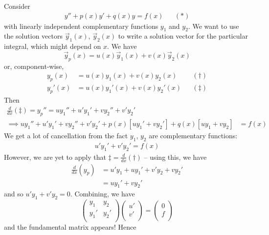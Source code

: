 \documentclass{../../template/note}
\begin{document}
    Consider
    \begin{align*}
        y'' + p(x)y' + q(x)y = f(x) && (*)
    \end{align*}
    with linearly independent complementary functions \(y_1\) and \(y_2\). We want to use the solution vectors \(\vec y_1(x)\), \(\vec y_2(x)\) to write a solution vector for the particular integral, which might depend on \(x\). We have
    \[
        \vec y_p(x) = u(x) \vec y_1(x) + v(x) \vec y_2(x)
    \]
    or, component-wise,
    \begin{align*}
        y_p(x) &= u(x)y_1(x) + v(x)y_2(x) && (\dagger) \\
        y_p'(x) &= u(x)y_1'(x) + v(x)y_2'(x) && (\ddagger)
    \end{align*}
    Then
    \begin{align*}
        \frac{d}{dx}(\ddagger) = y_p'' = uy_1'' + u'y_1' + vy_2'' + v'y_2'& \\
        \implies uy_1'' + u'y_1' + vy_2'' + v'y_2' + p(x)[uy_1' + vy_2'] + q(x)[uy_1 + vy_2] &= f(x)
    \end{align*}
    We get a lot of cancellation from the fact \(y_1\), \(y_2\) are complementary functions:
    \begin{align*}
        u'y_1' + v'y_2' = f(x)
    \end{align*}
    However, we are yet to apply that \(\ddagger = \frac{d}{dx}(\dagger)\) -- using this, we have
    \begin{align*}
        \frac{d}{dx}(y_p) &= u'y_1 + uy_1' + v'y_2 + vy_2' \\
        &= uy_1' + vy_2'
    \end{align*}
    and so \(u'y_1 + v'y_2 = 0\). Combining, we have
    \[
        \begin{pmatrix}
         y_1 & y_2 \\
         y_1' & y_2' \\
        \end{pmatrix}\begin{pmatrix}
         u' \\
         v' \\
        \end{pmatrix} = \begin{pmatrix}
         0 \\
         f \\
        \end{pmatrix}
    \]
    and the fundamental matrix appears! Hence
\end{document}
